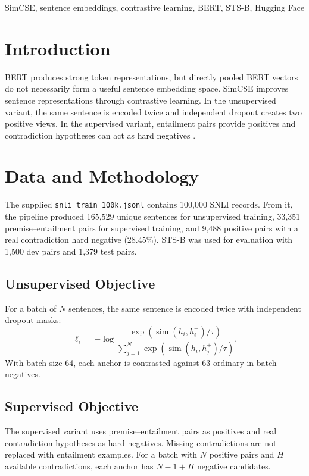 \documentclass[10pt,conference]{IEEEtran}
\begin{document}
\begin{IEEEkeywords}
SimCSE, sentence embeddings, contrastive learning, BERT, STS-B, Hugging Face
\end{IEEEkeywords}

\section{Introduction}
BERT produces strong token representations, but directly pooled BERT vectors do not necessarily form a useful sentence embedding space. SimCSE improves sentence representations through contrastive learning. In the unsupervised variant, the same sentence is encoded twice and independent dropout creates two positive views. In the supervised variant, entailment pairs provide positives and contradiction hypotheses can act as hard negatives \cite{gao2021}.

\section{Data and Methodology}
The supplied \texttt{snli\_train\_100k.jsonl} contains 100,000 SNLI records. From it, the pipeline produced 165,529 unique sentences for unsupervised training, 33,351 premise--entailment pairs for supervised training, and 9,488 positive pairs with a real contradiction hard negative (28.45\%). STS-B was used for evaluation with 1,500 dev pairs and 1,379 test pairs.

\subsection{Unsupervised Objective}
For a batch of $N$ sentences, the same sentence is encoded twice with independent dropout masks:
\begin{equation}
\ell_i=-\log\frac{\exp(\operatorname{sim}(h_i,h_i^+)/\tau)}{\sum_{j=1}^{N}\exp(\operatorname{sim}(h_i,h_j^+)/\tau)}.
\end{equation}
With batch size 64, each anchor is contrasted against 63 ordinary in-batch negatives.

\subsection{Supervised Objective}
The supervised variant uses premise--entailment pairs as positives and real contradiction hypotheses as hard negatives. Missing contradictions are not replaced with entailment examples. For a batch with $N$ positive pairs and $H$ available contradictions, each anchor has $N-1+H$ negative candidates.
\end{document}

